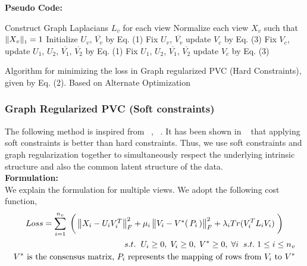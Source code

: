 \documentclass[a4paper]{article}
\begin{document}
	\noindent
	\textbf{Pseudo Code:}
	\begin{algorithm}
		Construct Graph Laplacians $L_{v}$ for each view\;
		Normalize each view $X_{v}$ such that $\|X_{v}\|_{\text{\tiny1}} = 1 $\;
		Initialize  $U_{v}$, $\overline{V_{v}}$ by Eq. (1)\;
		Fix $U_{v}$, $\overline{V_{v}}$ update $V_{c}$ by Eq. (3)\;		
		{
			{
				Fix $V_{c}$, update $U_{1}$, $U_{2}$, $\overline{V_{1}}$, $\overline{V_{2}}$ by Eq. (1)\;
			}
			Fix $U_{1}$, $U_{2}$, $\overline{V_{1}}$, $\overline{V_{2}}$ update $V_{c}$ by Eq. (3)\;
		}						
		\caption{Algorithm for minimizing the loss in Graph regularized PVC (Hard Constraints), given by Eq. (2). Based on Alternate Optimization}
	\end{algorithm}


	\subsubsection{Graph Regularized PVC (Soft constraints)}
	
	The following method is inspired from ~\cite{nmfsdm}, ~\cite{Greg}. It has been shown in ~\cite{nmfsdm} that applying soft constraints is better than hard constraints. Thus, we use soft constraints and graph regularization together to simultaneously respect the underlying intrinsic structure and also the common latent structure of the data.\\	
	
	\noindent
	\textbf{Formulation:}\\
	We explain the formulation for multiple views. We adopt the following cost function,
	\begin{multline}	
	Loss = \displaystyle\sum_{i=1}^{n_{v}} \; \bigg(\begin{Vmatrix} X_{i}-U_{i}V^{T}_{i} \end{Vmatrix}^{2}_{F}	
		+ \mu_{i}\begin{Vmatrix} V_{i}-V^{*}(\, P_{i} \, ) \end{Vmatrix}^{2}_{F}
		+ \lambda_{i}Tr(V^{T}_{i}L_{i}V_{i}) \; \bigg)\\	
		\hfill s.t. \hspace{2mm}  U_{i}\geq0,\;V_{i}\geq0,\;V^{*}\geq0,\;\forall i \;\;s.t.\; 1 \leq i \leq n_{v}\\
		\hfill V^{*} \text{ is the consensus matrix, }
		P_{i} \text{ represents the mapping of rows from } V_{i} \text{ to } V^{*}
	\end{multline}	
\end{document}

